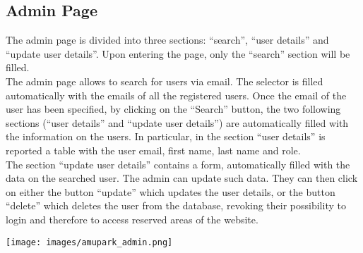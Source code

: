 \subsection{Admin Page}
The admin page is divided into three sections: “search”, “user details” and “update user details”. Upon
entering the page, only the “search” section will be filled.\\

The admin page allows to search for users via email. The selector is filled automatically with the emails
of all the registered users. Once the email of the user has been specified, by clicking on the “Search”
button, the two following sections (“user details” and “update user details”) are automatically filled with
the information on the users. In particular, in the section “user details” is reported a table with the user
email, first name, last name and role.\\ 

The section “update user details” contains a form, automatically filled with the data on the searched
user. The admin can update such data. They can then click on either the button “update” which
updates the user details, or the button “delete” which deletes the user from the database, revoking
their possibility to login and therefore to access reserved areas of the website.

\texttt{[image: images/amupark\_admin.png]}